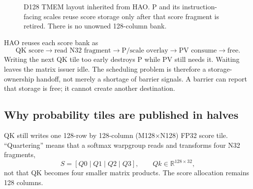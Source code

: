 \begin{figure}[htbp]
\centering
{}
\caption{D128 TMEM layout inherited from HAO. P and its instruction-facing
scales reuse score storage only after that score fragment is retired. There
is no unowned 128-column bank.}
\label{fig:tmem-layout}
\end{figure}

HAO reuses each score bank as
\begin{equation}
  \text{QK score}\rightarrow\text{read N32 fragment}
  \rightarrow\text{P/scale overlay}\rightarrow\text{PV consume}
  \rightarrow\text{free}.
  \label{eq:score-overlay}
\end{equation}
Writing the next QK tile too early destroys P while PV still needs it.
Waiting leaves the matrix issuer idle.  The scheduling problem is therefore a
storage-ownership handoff, not merely a shortage of barrier signals.  A
barrier can report that storage is free; it cannot create another destination.

\subsection{Why probability tiles are published in halves}

QK still writes one 128-row by 128-column (M128$\times$N128) FP32 score tile.
``Quartering'' means
that a softmax warpgroup reads and transforms four N32 fragments,
\begin{equation}
  S=[Q0\mid Q1\mid Q2\mid Q3],\qquad
  Qk\in\mathbb R^{128\times32},
\end{equation}
not that QK becomes four smaller matrix products. The score allocation remains
128 columns.

